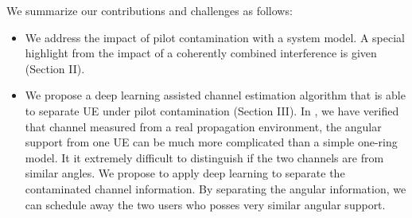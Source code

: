 We summarize our contributions and challenges as follows:
\begin{itemize}

\item We address the impact of pilot contamination with a system model. A special highlight from the impact of a coherently combined interference is given (Section II). 

\item We propose a deep learning assisted channel estimation algorithm that is able to separate UE under pilot contamination (Section III). In \cite{Chen2018pilot}, we have verified that channel measured from a real propagation environment, the angular support from one UE can be much more complicated than a simple one-ring model. It it extremely difficult to distinguish if the two channels are from similar angles. %
We propose to apply deep learning to separate the contaminated channel information. By separating the angular information, we can schedule away the two users who posses very similar angular support.


\end{itemize}

